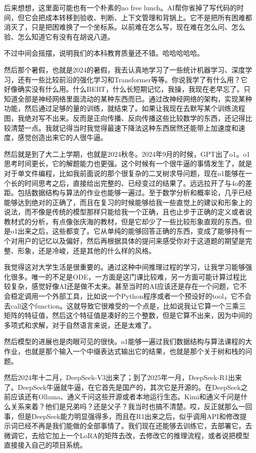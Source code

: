 后来想想，这里面可能也有一个朴素的no free lunch。AI帮你省掉了写代码的时间，但它会把成本转移到验收、判断、上下文管理和背锅上。它不是把所有困难都消灭了，只是把困难换了一个坐标系。以前难在怎么写，现在难在怎么问、怎么验、怎么知道它有没有在胡说八道。

不过中间会摇摆，说明我们的本科教育质量还不错。哈哈哈哈哈。

然后那个暑假，也就是2024的暑假，我去认真地学习了一些统计机器学习、深度学习，还有一些比较前沿的强化学习和Transformer等等。你说我学了有什么用？它好像确实没有什么用。什么BERT，什么长短期记忆，我操，我现在老早忘了。只知道全部是神经网络里面流动的某种东西而已。通过改神经网络的架构，实现某种功能，然后通过足够的量的训练，就结束了。如果让我现在去默写某个训练流程图，我绝对写不出来。反而是正向传播、反向传播这些比较数学的东西，还记得比较清楚一点。我就记得当时我觉得最速下降法这种东西居然还能带上加速度和速度，感觉创造出来它的人很牛逼。

然后就是到了大二上学期，也就是2024秋冬。2024年9月的时候，GPT出了o1。o1思考时间更长，它的解题能力也更强。这个时候有一个很牛逼的事情发生了，就是对于单文件编程，比如我前面说的那个很复杂的二叉树求导问题，现在o1能够在一个长的时间思考之后，直接给出完整的、已经变过的结果了。远远拉开了与4o的差距。包括数据结构与算法的作业也能够一遍过。至于数学分析和概率论，几乎已经能够达到绝对的正确了，而且在复习的时候能够给我一些直觉上的建议和形象上的说法，而不像是传统的模型那样只能给我一个正确，且也止步于正确的定义或者说教材式的分析，有点像张庆海的教材，但是它却少了一些比较形象直观的东西。但是o1出来之后，这些都变了。它从单纯的能够回答正确的东西，变成了能够持有一个对用户的记忆以及偏好，然后再根据具体的提问来感受你对于这道题的期望是完整、形象，还是冷峻，还是其他的什么样的风格。

我觉得这对大学生活是很重要的。通过这种中间推理过程的学习，让我学习能够强化很多。唯一的不足是ODE，一方面是这门课比较难，另一方面可能计算过程比较复杂，感觉好像AI还是做不太来。甚至当时的AI应该还是存在一个问题，它不会稳定调用一个外部工具，比如说一个Python程序或者一个预设好的tool，它不会去call这个function。这就导致它很难受的一个点是，比如说我让它算一个三乘三矩阵的特征值，然后这个特征值是凑好的三个整数，但是它算不出来，因为中间的多项式和求解，对于自然语言来说，还是太难了。

然后模型的进展也是肉眼可见的很快。o1能够一遍过我们数据结构与算法课程的大作业，也就是那个输入一个中缀表达式输出它的结果，也就是那个关于树和栈的问题。

然后2024年十二月，DeepSeek-V3出来了；到了2025年一月，DeepSeek-R1出来了。DeepSeek牛逼就牛逼，在它首先是国产的，其次它是开源的。在DeepSeek之前应该还有Ollama、通义千问这些开源或者本地运行生态。Kimi和通义千问是什么关系来着？他们是兄弟吗？还是父子？我当时也搞不清楚。哎，反正就那么一回事，但是DeepSeek能力明显强得多，而且在R1出来之后，似乎调用API和修改提示词已经不再是我们能做的全部事情了。我们现在还能够去训练它，去部署它，去微调它，去给它加上一个LoRA的矩阵去改，去修改它的推理流程，或者说把模型直接接入自己的项目系统。

